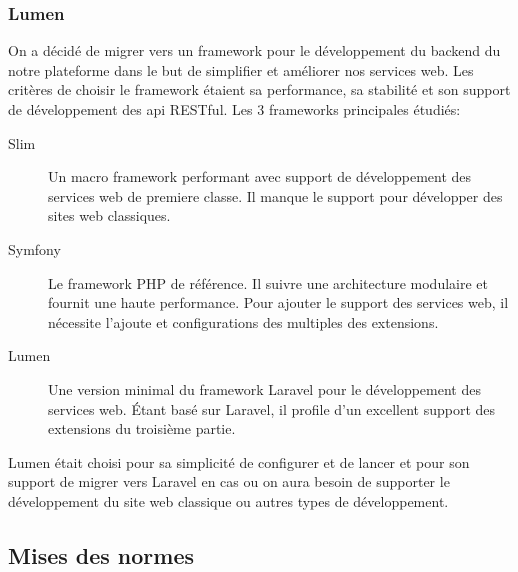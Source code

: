 \subsubsection{Lumen}

On a décidé de migrer vers un framework pour le développement du backend du
notre plateforme dans le but de simplifier et améliorer nos services web. Les
critères de choisir le framework étaient sa performance, sa stabilité et son
support de développement des api RESTful. Les 3 frameworks principales étudiés:

\begin{description}
    \item [Slim] Un macro framework performant avec support de développement
        des services web de premiere classe. Il manque le support pour
        développer des sites web classiques.
    \item [Symfony] Le framework PHP de référence. Il suivre une architecture
        modulaire et fournit une haute performance. Pour ajouter le support des
        services web, il nécessite l'ajoute et configurations des multiples des
        extensions.
    \item [Lumen] Une version minimal du framework Laravel pour le
        développement des services web. Étant basé sur Laravel, il profile d'un
        excellent support des extensions du troisième partie.
\end{description}

Lumen était choisi pour sa simplicité de configurer et de lancer et pour son
support de migrer vers Laravel en cas ou on aura besoin de supporter le
développement du site web classique ou autres types de développement.



\subsection{Mises des normes}

